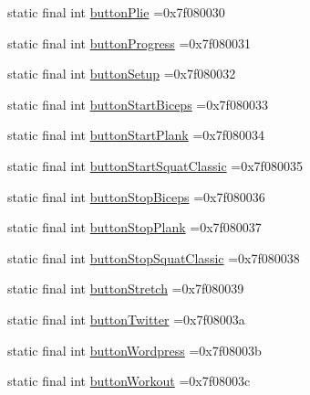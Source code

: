 \begin{DoxyCompactItemize}
static final int \mbox{\hyperlink{classcom_1_1example_1_1trainawearapplication_1_1_r_1_1id_a4dffc2044c914b3a15fbdacd3c369b97}{button\+Plie}} =0x7f080030
\item 
static final int \mbox{\hyperlink{classcom_1_1example_1_1trainawearapplication_1_1_r_1_1id_a23991baf6acb53a881cd0058909b54c1}{button\+Progress}} =0x7f080031
\item 
static final int \mbox{\hyperlink{classcom_1_1example_1_1trainawearapplication_1_1_r_1_1id_a066b3f465996ba7c3c2600c9ceced035}{button\+Setup}} =0x7f080032
\item 
static final int \mbox{\hyperlink{classcom_1_1example_1_1trainawearapplication_1_1_r_1_1id_a2d3063b49a856ced0c68d5caa3ed70bf}{button\+Start\+Biceps}} =0x7f080033
\item 
static final int \mbox{\hyperlink{classcom_1_1example_1_1trainawearapplication_1_1_r_1_1id_a206fd9cf84aad86924005a12c7dd90d7}{button\+Start\+Plank}} =0x7f080034
\item 
static final int \mbox{\hyperlink{classcom_1_1example_1_1trainawearapplication_1_1_r_1_1id_a2188491e7e153f7fb3dbf4de4b60942f}{button\+Start\+Squat\+Classic}} =0x7f080035
\item 
static final int \mbox{\hyperlink{classcom_1_1example_1_1trainawearapplication_1_1_r_1_1id_a03dff954dc448697ba07074b01d9997a}{button\+Stop\+Biceps}} =0x7f080036
\item 
static final int \mbox{\hyperlink{classcom_1_1example_1_1trainawearapplication_1_1_r_1_1id_af3e257d6cc2a93bf4fdd9bceb86da818}{button\+Stop\+Plank}} =0x7f080037
\item 
static final int \mbox{\hyperlink{classcom_1_1example_1_1trainawearapplication_1_1_r_1_1id_a6118ced90640f275b1182a3ba9d6301b}{button\+Stop\+Squat\+Classic}} =0x7f080038
\item 
static final int \mbox{\hyperlink{classcom_1_1example_1_1trainawearapplication_1_1_r_1_1id_ab4a58234dde61ddb48cd3f2f90d34775}{button\+Stretch}} =0x7f080039
\item 
static final int \mbox{\hyperlink{classcom_1_1example_1_1trainawearapplication_1_1_r_1_1id_a4575a50167e8e79b0390c94bf121ee35}{button\+Twitter}} =0x7f08003a
\item 
static final int \mbox{\hyperlink{classcom_1_1example_1_1trainawearapplication_1_1_r_1_1id_ae4d4638c909418cca5002814ed7f10eb}{button\+Wordpress}} =0x7f08003b
\item 
static final int \mbox{\hyperlink{classcom_1_1example_1_1trainawearapplication_1_1_r_1_1id_a02bf1874e79168091af5b82b73d0791a}{button\+Workout}} =0x7f08003c

\end{DoxyCompactItemize}
